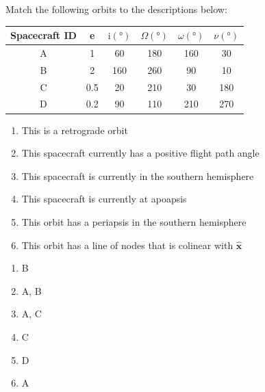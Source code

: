 \begin{hwkProblem}{7}{}

	Match the following orbits to the descriptions below:
	\begin{center}
		\begin{tabular}{cccccc}
			\hline
			Spacecraft ID & e & \(\mathrm{i} \left( \unit{\degree} \right) \) & \(\Omega \left( \unit{\degree} \right)\) & \(\omega \left( \unit{\degree} \right)\) & \(\nu \left( \unit{\degree} \right)\) \\
			\hline
			\hline
			A & 1 & 60 & 180 & 160 & 30 \\
			\hline
			B & 2 & 160 & 260 & 90 & 10 \\
			\hline
			C & 0.5 & 20 & 210 & 30 & 180 \\
			\hline
			D & 0.2 & 90 & 110 & 210 & 270 \\
			\hline
		\end{tabular}
	\end{center}
	\begin{enumerate}
		\item This is a retrograde orbit
		\item This spacecraft currently has a positive flight path angle
		\item This spacecraft is currently in the southern hemisphere
		\item This spacecraft is currently at apoapsis
		\item This orbit has a periapsis in the southern hemisphere
		\item This orbit has a line of nodes that is colinear with \( \bm\hat{{x}} \)
	\end{enumerate}

	\hwkSol

	\begin{enumerate}
		\item B
		\item A, B
		\item A, C
		\item C
		\item D
		\item A
	\end{enumerate}

\end{hwkProblem}
